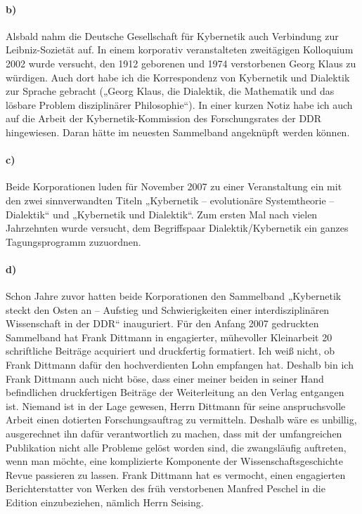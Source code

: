 \documentclass[11pt,a4paper]{article}
\begin{document}
\paragraph{b)}
Alsbald nahm die Deutsche Gesellschaft für Kybernetik auch Verbindung zur
Leibniz-Sozietät auf. In einem korporativ veranstalteten zweitägigen
Kolloquium 2002 wurde versucht, den 1912 geborenen und 1974 verstorbenen Georg
Klaus zu würdigen. Auch dort habe ich die Korrespondenz von Kybernetik und
Dialektik zur Sprache gebracht („Georg Klaus, die Dialektik, die Mathematik
und das lösbare Problem disziplinärer Philosophie“). In einer kurzen Notiz
habe ich auch auf die Arbeit der Kybernetik-Kommission des Forschungsrates der
DDR hingewiesen. Daran hätte im neuesten Sammelband angeknüpft werden können.

\paragraph{c)}
Beide Korporationen luden für November 2007 zu einer Veranstaltung ein mit den
zwei sinnverwandten Titeln „Kybernetik – evolutionäre Systemtheorie –
Dialektik“ und „Kybernetik und Dialektik“. Zum ersten Mal nach vielen
Jahrzehnten wurde versucht, dem Begriffspaar Dialektik/Kybernetik ein ganzes
Tagungsprogramm zuzuordnen.

\paragraph{d)}
Schon Jahre zuvor hatten beide Korporationen den Sammelband „Kybernetik steckt
den Osten an – Aufstieg und Schwierigkeiten einer interdisziplinären
Wissenschaft in der DDR“ inauguriert. Für den Anfang 2007 gedruckten
Sammelband hat Frank Dittmann in engagierter, mühevoller Kleinarbeit 20
schriftliche Beiträge acquiriert und druckfertig formatiert. Ich weiß nicht,
ob Frank Dittmann dafür den hochverdienten Lohn empfangen hat. Deshalb bin ich
Frank Dittmann auch nicht böse, dass einer meiner beiden in seiner Hand
befindlichen druckfertigen Beiträge der Weiterleitung an den Verlag entgangen
ist. Niemand ist in der Lage gewesen, Herrn Dittmann für seine anspruchsvolle
Arbeit einen dotierten Forschungsauftrag zu vermitteln. Deshalb wäre es
unbillig, ausgerechnet ihn dafür verantwortlich zu machen, dass mit der
umfangreichen Publikation nicht alle Probleme gelöst worden sind, die
zwangsläufig auftreten, wenn man möchte, eine komplizierte Komponente der
Wissenschaftsgeschichte Revue passieren zu lassen. Frank Dittmann hat es
vermocht, einen engagierten Berichterstatter von Werken des früh verstorbenen
Manfred Peschel in die Edition einzubeziehen, nämlich Herrn Seising.
\end{document}
